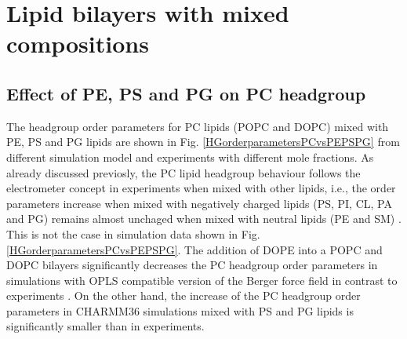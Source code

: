 \documentclass[aps,prl,superscriptaddress,twocolumn]{revtex4}
\begin{document}
\section{Lipid bilayers with mixed compositions}

\subsection{Effect of PE, PS and PG on PC headgroup}
The headgroup order parameters for PC lipids (POPC and DOPC)
mixed with PE, PS and PG lipids are shown in Fig. \ref{HGorderparametersPCvsPEPSPG}
from different simulation model and experiments \cite{scherer87} with different
mole fractions. As already discussed previosly, the PC lipid headgroup behaviour
follows the electrometer concept in experiments when mixed with other lipids, i.e., the order
parameters increase when mixed with negatively charged lipids (PS, PI, CL, PA and PG)
remains almost unchaged when mixed with neutral lipids (PE and SM) \cite{scherer87}.
This is not the case in simulation data shown in Fig. \ref{HGorderparametersPCvsPEPSPG}.
The addition of DOPE into a POPC and DOPC bilayers significantly decreases the PC headgroup
order parameters in simulations with OPLS compatible version of the Berger force field \cite{tieleman06}
in contrast to experiments \cite{scherer87}. On the other hand, the increase of the PC
headgroup order parameters in CHARMM36 simulations mixed with PS and PG lipids is significantly
smaller than in experiments.
\end{document}
